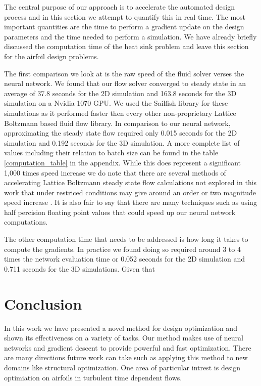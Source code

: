 \documentclass{article} %
\begin{document}
The central purpose of our approach is to accelerate the automated design process and in this section we attempt to quantify this in real time. The most important quantities are the time to perform a gradient update on the design parameters and the time needed to perform a simulation. We have already briefly discussed the computation time of the heat sink problem and leave this section for the airfoil design problems.

The first comparison we look at is the raw speed of the fluid solver verses the neural network. We found that our flow solver converged to steady state in an average of 37.8 seconds for the 2D simulation and 163.8 seconds for the 3D simulation on a Nvidia 1070 GPU. We used the Sailfish library \cite{januszewski2014sailfish} for these simulations as it performed faster then every other non-proprietary Lattice Boltzmann based fluid flow library. In comparison to our neural network, approximating the steady state flow required only 0.015 seconds for the 2D simulation and 0.192 seconds for the 3D simulation. A more complete list of values including their relation to batch size can be found in the table \ref{computation_table} in the appendix. While this does represent a significant 1,000 times speed increase we do note that there are several methods of accelerating Lattice Boltzmann steady state flow calculations not explored in this work that under restriced conditions may give around an order or two magnitude speed increase \cite{guo2013lattice} \cite{bernaschi2002computing}. It is also fair to say that there are many techniques such as using half percision floating point values that could speed up our neural network computations.

The other computation time that needs to be addressed is how long it takes to compute the gradients. In practice we found doing so required around 3 to 4 times the network evaluation time or 0.052 seconds for the 2D simulation and 0.711 seconds for the 3D simulations. Given that 

\section{Conclusion}

In this work we have presented a novel method for design optimization and shown its effectiveness on a variety of tasks. Our method makes use of neural networks and gradient descent to provide powerful and fast optimization. There are many directions future work can take such as applying this method to new domains like structural optimization. One area of particular intrest is design optimiation on airfoils in turbulent time dependent flows.
\end{document}
